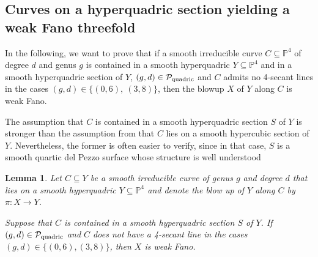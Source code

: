\documentclass[english,11pt,reqno]{amsart}
\newcommand{\sub}{\subseteq}
\newcommand{\Pfour}{\mathbb{P}^4}
\newtheorem{lem}[thm]{Lemma}
\begin{document}
\subsection{Curves on a hyperquadric section yielding a weak Fano threefold} \label{subsection:hyperquadric_weak_Fano}
%
%
In the following, we want to prove that if a smooth irreducible curve $C\sub \Pfour$ of degree $d$ and genus $g$ is contained in a smooth hyperquadric $Y\sub \Pfour$ and in a smooth hyperquadric section of $Y$, $(g,d)\in \mathcal{P}_{\textup{quadric}}$ and $C$ admits no 4-secant lines in the cases $(g,d)\in \{(0,6),\: (3,8)\}$, then the blowup $X$ of $Y$ along $C$ is weak Fano. \par 
The assumption that $C$ is contained in a smooth hyperquadric section $S$ of $Y$ is stronger than the assumption from  that $C$ lies on a smooth hypercubic section of $Y$. Nevertheless, the former is often easier to verify, since in that case, $S$ is a smooth quartic del Pezzo surface whose structure is well understood \par 
%
%
%
\begin{lem}\label{lem:quartic_del_Pezzo_in_list_implies_weak_Fano} \label{lem: }
Let $C \sub Y$ be a smooth irreducible curve of genus $g$ and degree $d$ that lies on a smooth hyperquadric $Y \sub \Pfour$ and denote the blow up of $Y$ along $C$ by $\pi:X\rightarrow Y$. \par 
Suppose that $C$ is contained in a smooth hyperquadric section $S$ of $Y$. If $(g,d)\in \mathcal{P}_{\textup{quadric}}$ and $C$ does not have a 4-secant line in the cases $(g,d)\in \{(0,6),(3,8)\}$, then $X$ is weak Fano.  
\end{lem}
%
%
%
\end{document}
